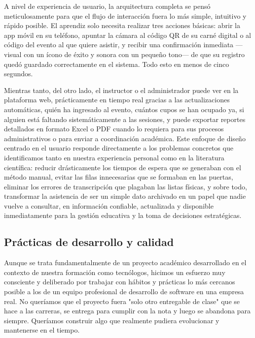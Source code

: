 A nivel de experiencia de usuario, la arquitectura completa se pensó meticulosamente para que el flujo de interacción fuera lo más simple, intuitivo y rápido posible. El aprendiz solo necesita realizar tres acciones básicas: abrir la app móvil en su teléfono, apuntar la cámara al código QR de su carné digital o al código del evento al que quiere asistir, y recibir una confirmación inmediata —visual con un ícono de éxito y sonora con un pequeño tono— de que su registro quedó guardado correctamente en el sistema. Todo esto en menos de cinco segundos.

Mientras tanto, del otro lado, el instructor o el administrador puede ver en la plataforma web, prácticamente en tiempo real gracias a las actualizaciones automáticas, quién ha ingresado al evento, cuántos cupos se han ocupado ya, si alguien está faltando sistemáticamente a las sesiones, y puede exportar reportes detallados en formato Excel o PDF cuando lo requiera para sus procesos administrativos o para enviar a coordinación académica. Este enfoque de diseño centrado en el usuario responde directamente a los problemas concretos que identificamos tanto en nuestra experiencia personal como en la literatura científica: reducir drásticamente los tiempos de espera que se generaban con el método manual, evitar las filas innecesarias que se formaban en las puertas, eliminar los errores de transcripción que plagaban las listas físicas, y sobre todo, transformar la asistencia de ser un simple dato archivado en un papel que nadie vuelve a consultar, en información confiable, actualizada y disponible inmediatamente para la gestión educativa y la toma de decisiones estratégicas.

\subsection{Prácticas de desarrollo y calidad}

Aunque se trata fundamentalmente de un proyecto académico desarrollado en el contexto de nuestra formación como tecnólogos, hicimos un esfuerzo muy consciente y deliberado por trabajar con hábitos y prácticas lo más cercanos posible a los de un equipo profesional de desarrollo de software en una empresa real. No queríamos que el proyecto fuera "solo otro entregable de clase" que se hace a las carreras, se entrega para cumplir con la nota y luego se abandona para siempre. Queríamos construir algo que realmente pudiera evolucionar y mantenerse en el tiempo.

